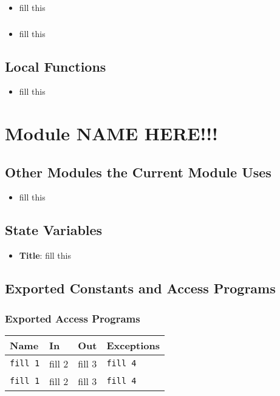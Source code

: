\documentclass[12pt, titlepage]{article}
\begin{document}
\begin{itemize}
    \item fill this
\end{itemize}

\subsubsection{}

\begin{itemize}
    \item fill this
\end{itemize}


\subsection{Local Functions}
\begin{itemize}
    \item fill this
\end{itemize}
\section{Module NAME HERE!!!}

\subsection{Other Modules the Current Module Uses}
\begin{itemize}
    \item fill this 
\end{itemize}

\subsection{State Variables}
\begin{itemize}
    \item \textbf{Title}: fill this 
\end{itemize}

\subsection{Exported Constants and Access Programs}
\subsubsection{Exported Access Programs}
\begin{tabular}{|l|l|l|l|}
    \hline
    \textbf{Name} & \textbf{In} & \textbf{Out} & \textbf{Exceptions} \\
    \hline 
    \texttt{fill 1} & fill 2 & fill 3 & \texttt{fill 4} \\
    \hline
    \texttt{fill 1} & fill 2 & fill 3 & \texttt{fill 4} \\
    \hline
\end{tabular}
\end{document}
